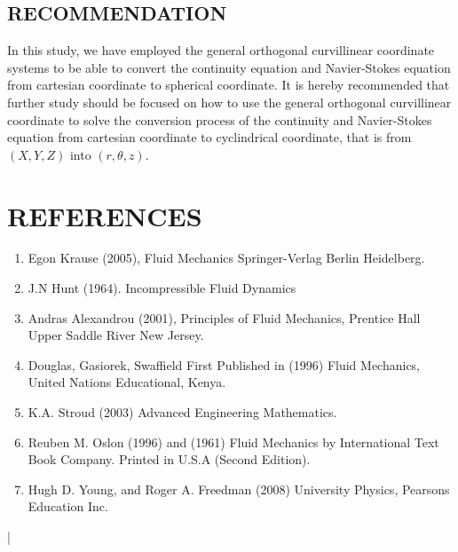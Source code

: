 \documentclass[12pt]{report}
\begin{document}
	
	\section{RECOMMENDATION}
	In this study, we have employed the general orthogonal curvillinear coordinate systems to be able to convert the continuity equation and Navier-Stokes equation from cartesian coordinate to spherical coordinate. It is hereby recommended that further study should be focused on how to use the general orthogonal curvillinear coordinate to solve the conversion process of the continuity and Navier-Stokes equation from cartesian coordinate to cyclindrical coordinate, that is from $(X, Y, Z)$ into $(r,\theta,z)$.
	
	
	\newpage
	\chapter*{REFERENCES}
	\begin{enumerate}
		\item Egon Krause (2005), Fluid Mechanics Springer-Verlag Berlin Heidelberg.
		
		\item J.N Hunt (1964). Incompressible Fluid Dynamics
		
		\item Andras Alexandrou (2001), Principles of Fluid Mechanics, Prentice Hall Upper Saddle River New Jersey.
		
		\item Douglas, Gasiorek, Swaffield First Published in (1996) Fluid Mechanics, United Nations Educational, Kenya.
		
		\item K.A. Stroud (2003) Advanced Engineering Mathematics.
		
		\item Reuben M. Oslon (1996) and (1961) Fluid Mechanics by International Text Book Company. Printed in U.S.A (Second Edition).
		
		\item Hugh D. Young, and Roger A. Freedman (2008) University Physics, Pearsons Education Inc.
	\end{enumerate}
	
	
	|
	
	
	
	
	
\end{document}
